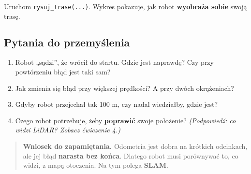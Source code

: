 Uruchom \texttt{rysuj\_trase(...)}. Wykres pokazuje, jak robot \textbf{wyobraża sobie} swoją trasę.

\subsection{Pytania do przemyślenia}\label{pytania-do-przemyux15blenia}

\begin{enumerate}
\def\labelenumi{\arabic{enumi}.}
\tightlist
\item
  Robot „sądzi'', że wrócił do startu. Gdzie jest naprawdę? Czy przy powtórzeniu błąd jest taki sam?
\item
  Jak zmienia się błąd przy większej prędkości? A przy dwóch okrążeniach?
\item
  Gdyby robot przejechał tak 100 m, czy nadal wiedziałby, gdzie jest?
\item
  Czego robot potrzebuje, żeby \textbf{poprawić} swoje położenie? \emph{(Podpowiedź: co widzi LiDAR? Zobacz ćwiczenie 4.)}
\end{enumerate}

\begin{quote}
\textbf{Wniosek do zapamiętania.} Odometria jest dobra na krótkich odcinkach, ale jej błąd \textbf{narasta bez końca}. Dlatego robot musi porównywać to, co widzi, z mapą otoczenia. Na tym polega \textbf{SLAM}.
\end{quote}
